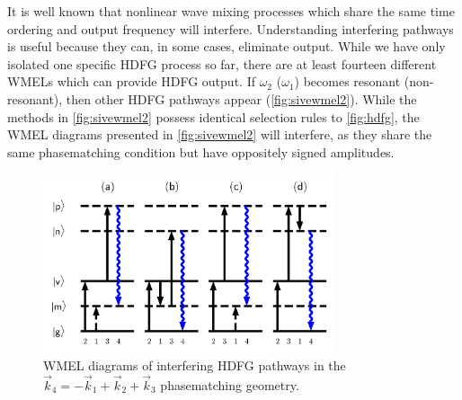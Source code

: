 \documentclass[aip, jcp, reprint, onecolumn]{revtex4-2}
\begin{document}
It is well known that nonlinear wave mixing processes which share the same time ordering and output frequency will interfere. \cite{RN342, RN135}
Understanding interfering pathways is useful because they can, in some cases, eliminate output. 
While we have only isolated one specific HDFG process so far, there are at least fourteen different WMELs which can provide HDFG output. \cite{RN352}
If $\omega_2$ ($\omega_1$) becomes resonant (non-resonant), then other HDFG pathways appear (\autoref{fig:sivewmel2}).\cite{McDonnell2024} 
While the methods in \autoref{fig:sivewmel2} possess identical selection rules to \autoref{fig:hdfg}, the WMEL diagrams presented in \autoref{fig:sivewmel2} will interfere, as they share the same phasematching condition but have oppositely signed amplitudes.
\begin{figure}[!htbp]
	\centering
	\includegraphics[width=3.375in]{figures/timeorderedwmel.png}
	\caption{WMEL diagrams of interfering HDFG pathways in the  $\vec{k}_4 = -\vec{k}_1 + \vec{k}_2 + \vec{k}_3$ phasematching geometry. 
		}
	\label{fig:sivewmel2}
\end{figure}
\end{document}
